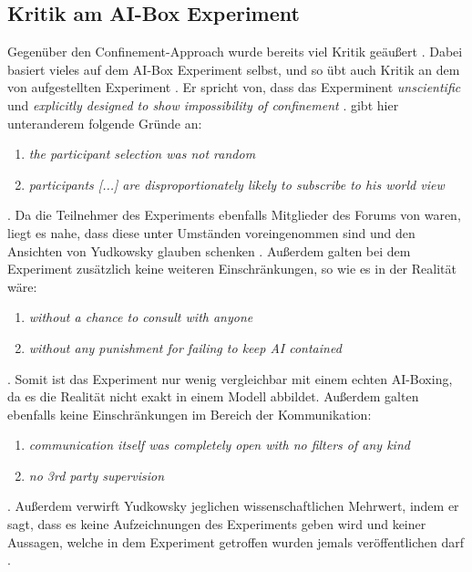         \subsection{Kritik am AI-Box Experiment}
        Gegenüber den Confinement-Approach wurde bereits viel Kritik geäußert \cite[s. 203]{yampolskiy2012leakproofing}.
        Dabei basiert vieles auf dem AI-Box Experiment selbst, und so übt auch \citeauthor{yampolskiy2012leakproofing} Kritik
        an dem von \citeauthor{yudkowsky_2002} aufgestellten Experiment \citeyearpar{yampolskiy2012leakproofing}. Er spricht
        von, dass das Experminent \textit{unscientific} und \textit{explicitly designed to show impossibility of confinement}
        \citeyearpar{yampolskiy2012leakproofing}. \citeauthor{yampolskiy2012leakproofing} gibt hier unteranderem folgende
        Gründe an:
        \begin{enumerate}
            \item \textit{the participant selection was not random}
            \item \textit{participants [...] are disproportionately likely to subscribe to his world view}
        \end{enumerate}
        \cite[s. 203]{yampolskiy2012leakproofing}. Da die Teilnehmer des Experiments ebenfalls Mitglieder des Forums von
        \citeauthor{yudkowsky_2002} waren, liegt es nahe, dass diese unter Umständen voreingenommen sind und den Ansichten
        von Yudkowsky glauben schenken \citeyearpar{yudkowsky_2002}. Außerdem galten bei dem Experiment zusätzlich keine
        weiteren Einschränkungen, so wie es in der Realität wäre:
        \begin{enumerate}
            \item \textit{without a chance to consult with anyone}
            \item \textit{without any punishment for failing to keep AI contained}
        \end{enumerate}
        \cite[s. 203]{yampolskiy2012leakproofing}. Somit ist das Experiment nur wenig vergleichbar mit einem echten AI-Boxing,
        da es die Realität nicht exakt in einem Modell abbildet.
        Außerdem galten ebenfalls keine Einschränkungen im Bereich der Kommunikation:
        \begin{enumerate}
            \item \textit{communication itself was completely open with no filters of any kind}
            \item \textit{no 3rd party supervision}
        \end{enumerate}
        \cite[s. 203]{yampolskiy2012leakproofing}. Außerdem verwirft Yudkowsky jeglichen wissenschaftlichen Mehrwert,
        indem er sagt, dass es keine Aufzeichnungen des Experiments geben wird und keiner Aussagen, welche in dem
        Experiment getroffen wurden jemals veröffentlichen darf \cite[s. 203]{yampolskiy2012leakproofing}.


